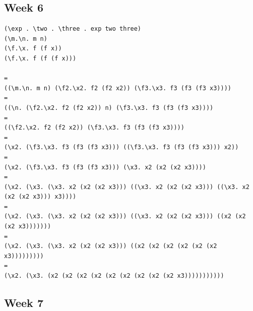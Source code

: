 \documentclass{article}
\theoremstyle{theorem}
\theoremstyle{definition}
\theoremstyle{remark}
\begin{document}
\subsection{Week 6}
\begin{lstlisting}
(\exp . \two . \three . exp two three)
(\m.\n. m n)
(\f.\x. f (f x))
(\f.\x. f (f (f x)))

=
((\m.\n. m n) (\f2.\x2. f2 (f2 x2)) (\f3.\x3. f3 (f3 (f3 x3))))
=
((\n. (\f2.\x2. f2 (f2 x2)) n) (\f3.\x3. f3 (f3 (f3 x3))))
=
((\f2.\x2. f2 (f2 x2)) (\f3.\x3. f3 (f3 (f3 x3))))
=
(\x2. (\f3.\x3. f3 (f3 (f3 x3))) ((\f3.\x3. f3 (f3 (f3 x3))) x2))
=
(\x2. (\f3.\x3. f3 (f3 (f3 x3))) (\x3. x2 (x2 (x2 x3))))
=
(\x2. (\x3. (\x3. x2 (x2 (x2 x3))) ((\x3. x2 (x2 (x2 x3))) ((\x3. x2 (x2 (x2 x3))) x3))))
=
(\x2. (\x3. (\x3. x2 (x2 (x2 x3))) ((\x3. x2 (x2 (x2 x3))) ((x2 (x2 (x2 x3)))))))
=
(\x2. (\x3. (\x3. x2 (x2 (x2 x3))) ((x2 (x2 (x2 (x2 (x2 (x2 x3)))))))))
=
(\x2. (\x3. (x2 (x2 (x2 (x2 (x2 (x2 (x2 (x2 (x2 x3)))))))))))
\end{lstlisting}
\subsection{Week 7}
\end{document}
